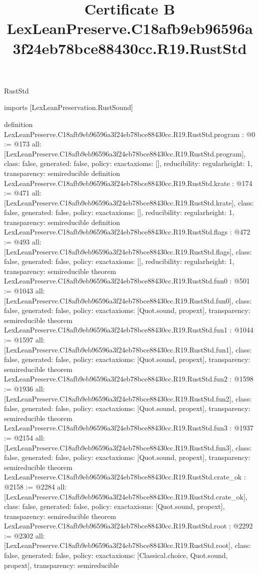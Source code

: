 \begin{lexlean}{RustStd}
\title{Certificate B LexLeanPreserve.C18afb9eb96596a3f24eb78bce88430cc.R19.RustStd}
\begin{coremodule}
imports [LexLeanPreservation.RustSound]

definition LexLeanPreserve.C18afb9eb96596a3f24eb78bce88430cc.R19.RustStd.program : @0 := @173 {
  all: [LexLeanPreserve.C18afb9eb96596a3f24eb78bce88430cc.R19.RustStd.program],
  class: false,
  generated: false,
  policy: exact{axioms: []},
  reducibility: regular{height: 1},
  transparency: semireducible
}
definition LexLeanPreserve.C18afb9eb96596a3f24eb78bce88430cc.R19.RustStd.krate : @174 := @471 {
  all: [LexLeanPreserve.C18afb9eb96596a3f24eb78bce88430cc.R19.RustStd.krate],
  class: false,
  generated: false,
  policy: exact{axioms: []},
  reducibility: regular{height: 1},
  transparency: semireducible
}
definition LexLeanPreserve.C18afb9eb96596a3f24eb78bce88430cc.R19.RustStd.flags : @472 := @493 {
  all: [LexLeanPreserve.C18afb9eb96596a3f24eb78bce88430cc.R19.RustStd.flags],
  class: false,
  generated: false,
  policy: exact{axioms: []},
  reducibility: regular{height: 1},
  transparency: semireducible
}
theorem LexLeanPreserve.C18afb9eb96596a3f24eb78bce88430cc.R19.RustStd.fun0 : @501 := @1043 {
  all: [LexLeanPreserve.C18afb9eb96596a3f24eb78bce88430cc.R19.RustStd.fun0],
  class: false,
  generated: false,
  policy: exact{axioms: [Quot.sound, propext]},
  transparency: semireducible
}
theorem LexLeanPreserve.C18afb9eb96596a3f24eb78bce88430cc.R19.RustStd.fun1 : @1044 := @1597 {
  all: [LexLeanPreserve.C18afb9eb96596a3f24eb78bce88430cc.R19.RustStd.fun1],
  class: false,
  generated: false,
  policy: exact{axioms: [Quot.sound, propext]},
  transparency: semireducible
}
theorem LexLeanPreserve.C18afb9eb96596a3f24eb78bce88430cc.R19.RustStd.fun2 : @1598 := @1936 {
  all: [LexLeanPreserve.C18afb9eb96596a3f24eb78bce88430cc.R19.RustStd.fun2],
  class: false,
  generated: false,
  policy: exact{axioms: [Quot.sound, propext]},
  transparency: semireducible
}
theorem LexLeanPreserve.C18afb9eb96596a3f24eb78bce88430cc.R19.RustStd.fun3 : @1937 := @2154 {
  all: [LexLeanPreserve.C18afb9eb96596a3f24eb78bce88430cc.R19.RustStd.fun3],
  class: false,
  generated: false,
  policy: exact{axioms: [Quot.sound, propext]},
  transparency: semireducible
}
theorem LexLeanPreserve.C18afb9eb96596a3f24eb78bce88430cc.R19.RustStd.crate_ok : @2158 := @2284 {
  all: [LexLeanPreserve.C18afb9eb96596a3f24eb78bce88430cc.R19.RustStd.crate_ok],
  class: false,
  generated: false,
  policy: exact{axioms: [Quot.sound, propext]},
  transparency: semireducible
}
theorem LexLeanPreserve.C18afb9eb96596a3f24eb78bce88430cc.R19.RustStd.root : @2292 := @2302 {
  all: [LexLeanPreserve.C18afb9eb96596a3f24eb78bce88430cc.R19.RustStd.root],
  class: false,
  generated: false,
  policy: exact{axioms: [Classical.choice, Quot.sound, propext]},
  transparency: semireducible
}


\end{coremodule}
\end{lexlean}
